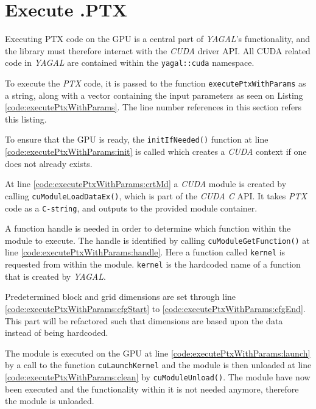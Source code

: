 \section{Execute .PTX} \label{cha:execPtx}

Executing PTX code on the GPU is a central part of \textit{YAGAL}'s functionality, and the library must therefore interact with the \textit{CUDA} driver API. All CUDA related code in \textit{YAGAL} are contained within the \texttt{yagal::cuda} namespace. 

To execute the \textit{PTX} code, it is passed to the function \texttt{executePtxWithParams} as a string, along with a vector containing the input parameters as seen on Listing \ref{code:executePtxWithParams}. The line number references in this section refers this listing.

To ensure that the GPU is ready, the \texttt{initIfNeeded()} function at line \ref{code:executePtxWithParams:init} is called which creates a \textit{CUDA} context if one does not already exists.

At line \ref{code:executePtxWithParams:crtMd} a \textit{CUDA} module is created by calling \texttt{cuModuleLoadDataEx()}, which is part of the \textit{CUDA C} API. It takes \textit{PTX} code as a \texttt{C-string}, and outputs to the provided module container.

A function handle is needed in order to determine which function within the module to execute. The handle is identified by calling \texttt{cuModuleGetFunction()} at line \ref{code:executePtxWithParams:handle}. Here a function called \texttt{kernel} is requested from within the module. \texttt{kernel} is the hardcoded name of a function that is created by \textit{YAGAL}.

Predetermined block and grid dimensions are set through line \ref{code:executePtxWithParams:cfgStart} to \ref{code:executePtxWithParams:cfgEnd}. This part will be refactored such that dimensions are based upon the data instead of being hardcoded.

The module is executed on the GPU at line \ref{code:executePtxWithParams:launch} by a call to the function \texttt{cuLaunchKernel} and the module is then unloaded at line \ref{code:executePtxWithParams:clean} by \texttt{cuModuleUnload()}. The module have now been executed and the functionality within it is not needed anymore, therefore the module is unloaded.


